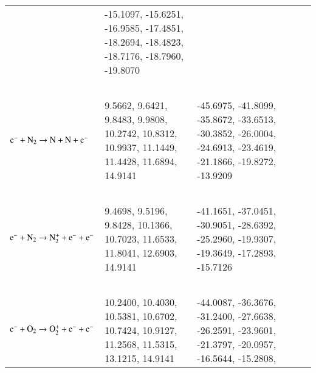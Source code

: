 \documentclass{warpdoc}
\begin{document}
\begin{table}[!ht]
\begin{threeparttable}
\begin{tabular*}{\textwidth}{@{}l@{\extracolsep{\fill}}llll@{}}
\begin{minipage}[t]{0.3\textwidth}
 \end{minipage}  & \begin{minipage}[t]{0.3\textwidth}\raggedright 
    -15.1097,  -15.6251,  -16.9585,  -17.4851,  -18.2694,  -18.4823,  -18.7176,  -18.7960,  -19.8070

\end{minipage} \\
~\\

   { $\rm e^- + N_2 \rightarrow N+N + e^-$   } & \begin{minipage}[t]{0.3\textwidth}\raggedright  
    9.5662, 9.6421, 9.8483, 9.9808, 10.2742, 10.8312, 10.9937, 11.1449, 11.4428, 11.6894, 14.9141
 \end{minipage}  & \begin{minipage}[t]{0.35\textwidth}\raggedright 
  -45.6975, -41.8099, -35.8672, -33.6513, -30.3852, -26.0004, -24.6913, -23.4619, -21.1866, -19.8272, -13.9209
\end{minipage} \\
~\\

   { $\rm e^- + N_2 \rightarrow N_{2}^+ +e^- + e^-$   } & \begin{minipage}[t]{0.3\textwidth}\raggedright  
         9.4698,    9.5196,    9.8428,   10.1366,   10.7023,   11.6533,   11.8041,   12.6903,   14.9141


 \end{minipage}  & \begin{minipage}[t]{0.35\textwidth}\raggedright 
    -41.1651,  -37.0451,  -30.9051,  -28.6392,  -25.2960,  -19.9307,  -19.3649,  -17.2893,  -15.7126


\end{minipage} \\
~\\

   { $\rm e^- + O_2 \rightarrow O_{2}^+ +e^- + e^-$   } & \begin{minipage}[t]{0.3\textwidth}\raggedright  
    10.2400,   10.4030,   10.5381,   10.6702,   10.7424,   10.9127,   11.2568,   11.5315,   13.1215,   14.9141

 \end{minipage}  & \begin{minipage}[t]{0.35\textwidth}\raggedright 
   -44.0087,  -36.3676,  -31.2400,  -27.6638,  -26.2591,  -23.9601,  -21.3797,  -20.0957,  -16.5644,  -15.2808,


\end{minipage}
\end{tabular*}
\end{threeparttable}
\end{table}
\end{document}
